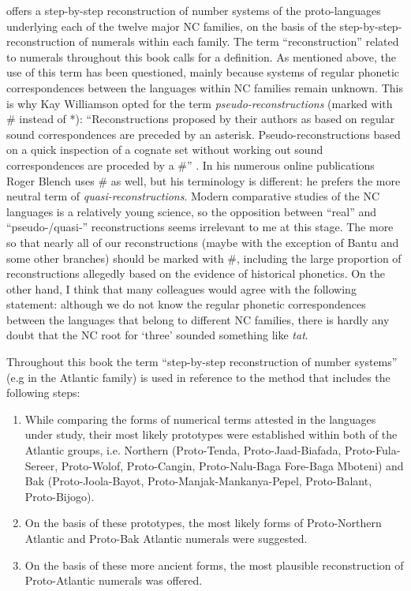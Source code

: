  offers a step-by-step reconstruction of number systems of the proto-languages underlying each of the twelve major NC families, on the basis of the step-by-step-reconstruction of numerals within each family. The term “reconstruction” related to numerals throughout this book calls for a definition.  As mentioned above, the use of this term has been questioned, mainly because systems of regular phonetic correspondences between the languages within NC families remain unknown. This is why Kay Williamson opted for the term \textit{pseudo-reconstructions} (marked with \# instead of *): “Reconstructions proposed by their authors as based on regular sound correspondences are preceded by an asterisk. Pseudo-reconstructions based on a quick inspection of a cognate set without working out sound correspondences are proceded by a \#” \citep[251]{Williamson1989b}. In his numerous online publications Roger Blench uses \# as well, but his terminology is different: he prefers the more neutral term of \textit{quasi-reconstructions}. Modern comparative studies of the NC languages is a relatively young science, so the opposition between “real” and “pseudo-/quasi-” reconstructions seems irrelevant to me at this stage. The more so that nearly all of our reconstructions (maybe with the exception of Bantu and some other branches) should be marked with \#, including the large proportion of reconstructions allegedly based on the evidence of historical phonetics. On the other hand, I think that many colleagues would agree with the following statement: although we do not know the regular phonetic correspondences between the languages that belong to different NC families, there is hardly any doubt that the NC root for ‘three’ sounded something like \textit{tat}.

Throughout this book the term “step-by-step reconstruction of number systems” (e.g in the Atlantic family) is used in reference to the method that includes the following steps:

\begin{enumerate}
\item While comparing the forms of numerical terms attested in the languages under study, their most likely prototypes were established within both of the Atlantic groups, i.e. Northern (Proto-Tenda, Proto-Jaad-Biafada, Proto-Fula-Sereer, Proto-Wolof, Proto-Cangin, Proto-Nalu-Baga Fore-Baga Mbo\-te\-ni) and Bak (Proto-Joola-Bayot, Proto-Manjak-Mankanya-Pepel, Proto-Balant, Proto-Bijogo).
\item On the basis of these prototypes, the most likely forms of Proto-Northern Atlantic and Proto-Bak Atlantic numerals were suggested.
\item On the basis of these more ancient forms, the most plausible reconstruction of Proto-Atlantic numerals was offered.
\end{enumerate}

